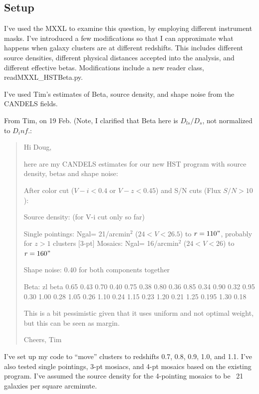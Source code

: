 \documentclass[11pt]{article}
\begin{document}
\subsection{Setup}
I've used the MXXL to examine this question, by employing different instrument masks. I've introduced a few modifications so that I can approximate what happens when galaxy clusters are at different redshifts. This includes different source densities, different physical distances accepted into the analysis, and different effective betas. Modifications include a new reader class, readMXXL\_HSTBeta.py. 

I've used Tim's estimates of Beta, source density, and shape noise from the CANDELS fields. 

From Tim, on 19 Feb. (Note, I clarified that Beta here is $D_{ls}/D_s$, not normalized to $D_inf$.:
\begin{quotation}
Hi Doug,

here are my CANDELS estimates for our new HST program with source density, betas and shape noise:


After color cut ($V-i<0.4$ or $V-z<0.45$) and S/N cuts (Flux $S/N>10$):

Source density: (for V-i cut only so far) 

Single pointings: Ngal= 21/arcmin$^2$ ($24<V<26.5$) to $r=110"$, probably for $z>1$ clusters
[3-pt] Mosaics:          Ngal= 16/arcmin$^2$   ($24<V<26$)   to $r=160"$

Shape noise:
0.40 for both components together

Beta:
zl      beta
0.65  0.43  
0.70  0.40  
0.75  0.38   
0.80  0.36       
0.85  0.34   
0.90  0.32   
0.95  0.30   
1.00  0.28
1.05  0.26
1.10  0.24
1.15  0.23
1.20  0.21 
1.25  0.195
1.30  0.18

This is a bit pessimistic given that it uses uniform and not optimal weight, but this can be seen as margin.

Cheers, Tim
\end{quotation}

I've set up my code to ``move'' clusters to redshifts 0.7, 0.8, 0.9, 1.0, and 1.1. I've also tested single pointings, 3-pt mosiacs, and 4-pt mosaics based on the existing program. I've assumed the source density for the 4-pointing mosaics to be ~21 galaxies per square arcminute.


\clearpage \newpage
\end{document}
